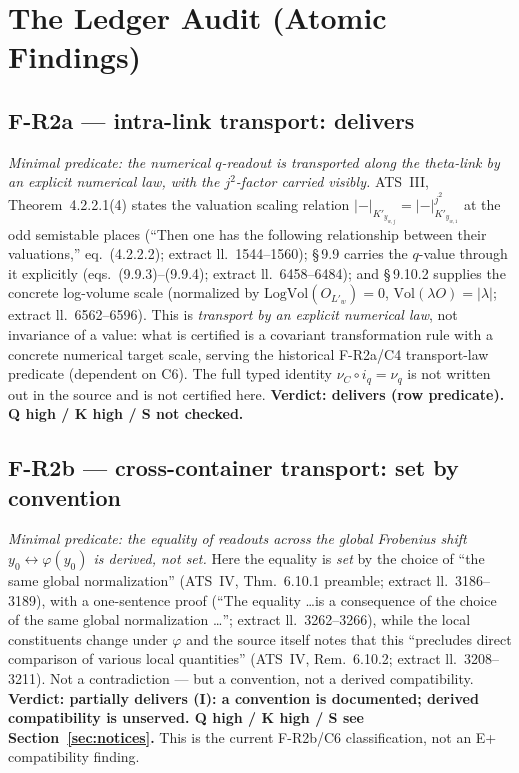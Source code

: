 \documentclass[11pt,a4paper]{article}
\begin{document}
\section{The Ledger Audit (Atomic Findings)}\label{sec:ledger}

\subsection{F-R2a --- intra-link transport: delivers}\label{sec:r2a}

\emph{Minimal predicate: the numerical $q$-readout is transported along the
theta-link by an explicit numerical law, with the $j^2$-factor carried
visibly.} ATS~III, Theorem~4.2.2.1(4) states the valuation scaling relation
$|-|_{K'_{y_{w,j}}} = |-|^{j^2}_{K'_{y_{w,1}}}$ at the odd semistable places
(``Then one has the following relationship between their valuations,''
eq.~(4.2.2.2); extract ll.~1544--1560); \S\,9.9 carries the $q$-value through it
explicitly (eqs.~(9.9.3)--(9.9.4); extract ll.~6458--6484); and \S\,9.10.2
supplies the concrete log-volume scale (normalized by
$\mathrm{LogVol}(O_{L'_w}) = 0$, $\mathrm{Vol}(\lambda O) = |\lambda|$;
extract ll.~6562--6596). This is \emph{transport by an explicit numerical
law}, not invariance of a value: what is certified is a covariant
transformation rule with a concrete numerical target scale, serving the historical F-R2a/C4 transport-law predicate (dependent on C6). The full typed identity $\nu_C \circ i_q = \nu_q$ is not written
out in the source and is not certified here.
\textbf{Verdict: delivers (row predicate). Q high / K high / S not checked.}

\subsection{F-R2b --- cross-container transport: set by convention}\label{sec:r2b}

\emph{Minimal predicate: the equality of readouts across the global Frobenius
shift $y_0 \leftrightarrow \varphi(y_0)$ is derived, not set.} Here the
equality is \emph{set} by the choice of ``the same global normalization''
(ATS~IV, Thm.~6.10.1 preamble; extract ll.~3186--3189), with a one-sentence
proof (``The equality \dots is a consequence of the choice of the same global
normalization \dots''; extract ll.~3262--3266), while the local constituents
change under $\varphi$ and the source itself notes that this ``precludes
direct comparison of various local quantities'' (ATS~IV, Rem.~6.10.2; extract
ll.~3208--3211). Not a contradiction --- but a convention, not a derived
compatibility. \textbf{Verdict: partially delivers (I): a convention is documented;
derived compatibility is unserved. Q high / K high / S see
Section~\ref{sec:notices}.} This is the current F-R2b/C6 classification,
not an E+ compatibility finding.
\end{document}
